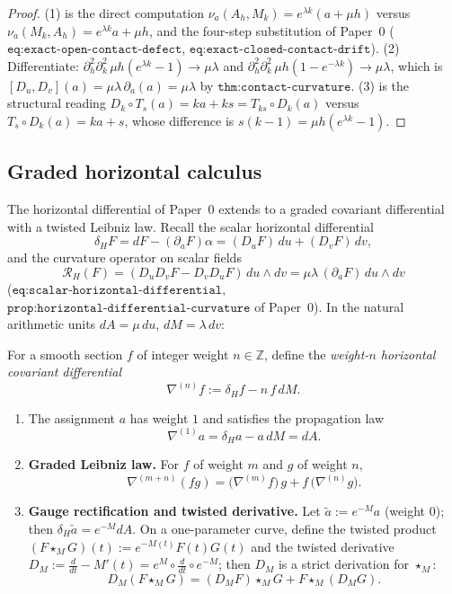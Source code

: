 \begin{proof}
(1) is the direct computation
$\nu_a(A_h,M_k)=e^{\lambda k}(a+\mu h)$ versus
$\nu_a(M_k,A_h)=e^{\lambda k}a+\mu h$, and the four-step substitution of
Paper~0 ($\texttt{eq:exact-open-contact-defect}$,
$\texttt{eq:exact-closed-contact-drift}$).  (2) Differentiate:
$\partial^2_h\partial^2_k\,\mu h(e^{\lambda k}-1)\to\mu\lambda$ and
$\partial^2_h\partial^2_k\,\mu h(1-e^{-\lambda k})\to\mu\lambda$, which is
$[D_u,D_v](a)=\mu\lambda\,\partial_a(a)=\mu\lambda$ by
$\texttt{thm:contact-curvature}$.  (3) is the structural reading
$D_k\circ T_s(a)=ka+ks=T_{ks}\circ D_k(a)$ versus $T_s\circ D_k(a)=ka+s$, whose
difference is $s(k-1)=\mu h(e^{\lambda k}-1)$.
\end{proof}

\subsection{Graded horizontal calculus}

The horizontal differential of Paper~0 extends to a graded covariant
differential with a twisted Leibniz law.  Recall the scalar horizontal
differential
\[
  \delta_H F=dF-(\partial_a F)\alpha=(D_uF)\,du+(D_vF)\,dv,
\]
and the curvature operator on scalar fields
\[
  \mathcal R_H(F)=(D_uD_vF-D_vD_uF)\,du\wedge dv=\mu\lambda\,(\partial_aF)\,du\wedge dv
\]
($\texttt{eq:scalar-horizontal-differential}$,
$\texttt{prop:horizontal-differential-curvature}$ of Paper~0).  In the natural
arithmetic units $dA=\mu\,du$, $dM=\lambda\,dv$:

\begin{definition}
\label{def:graded-horizontal-differential}
For a smooth section $f$ of integer weight $n\in\mathbb Z$, define the
\emph{weight-$n$ horizontal covariant differential}
\[
  \nabla^{(n)}f:=\delta_H f-n\,f\,dM .
\]
\end{definition}

\begin{proposition}
\label{prop:graded-leibniz-and-gauge}
\begin{enumerate}
  \item The assignment $a$ has weight $1$ and satisfies the propagation law
  \[
    \nabla^{(1)}a=\delta_H a-a\,dM=dA .
  \]
  \item \textbf{Graded Leibniz law.} For $f$ of weight $m$ and $g$ of weight
  $n$,
  \[
    \nabla^{(m+n)}(fg)=\bigl(\nabla^{(m)}f\bigr)\,g+f\,\bigl(\nabla^{(n)}g\bigr).
  \]
  \item \textbf{Gauge rectification and twisted derivative.} Let
  $\widetilde a:=e^{-M}a$ (weight $0$); then
  $\delta_H\widetilde a=e^{-M}dA$.  On a one-parameter curve, define the
  twisted product $(F\star_M G)(t):=e^{-M(t)}F(t)G(t)$ and the twisted
  derivative $D_M:=\frac{d}{dt}-M'(t)=e^{M}\circ\frac d{dt}\circ e^{-M}$; then
  $D_M$ is a strict derivation for $\star_M$:
  \[
    D_M(F\star_M G)=(D_MF)\star_M G+F\star_M(D_M G).
  \]
\end{enumerate}
\end{proposition}


